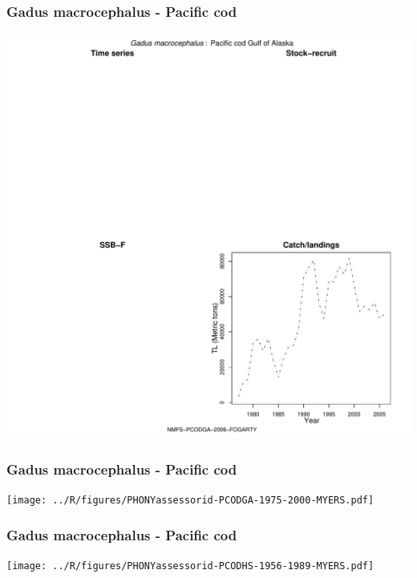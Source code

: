 \subsubsection{Gadus macrocephalus - Pacific cod}
\begin{center}
\includegraphics[width=1.2\textwidth]{../R/figures/NMFS-PCODGA-2006-FOGARTY.pdf}
\end{center}

\subsubsection{Gadus macrocephalus - Pacific cod}
\begin{center}
\texttt{[image: ../R/figures/PHONYassessorid-PCODGA-1975-2000-MYERS.pdf]}
\end{center}

\subsubsection{Gadus macrocephalus - Pacific cod}
\begin{center}
\texttt{[image: ../R/figures/PHONYassessorid-PCODHS-1956-1989-MYERS.pdf]}
\end{center}

